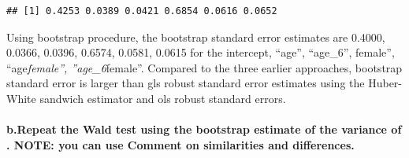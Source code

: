 \documentclass[
]{article}
\begin{document}
\begin{verbatim}
## [1] 0.4253 0.0389 0.0421 0.6854 0.0616 0.0652
\end{verbatim}

Using bootstrap procedure, the bootstrap standard error estimates are
0.4000, 0.0366, 0.0396, 0.6574, 0.0581, 0.0615 for the intercept,
``age'', ``age\_6'', female'', ``age\emph{female'', ''age\_6}female''.
Compared to the three earlier approaches, bootstrap standard error is
larger than gls robust standard error estimates using the Huber-White
sandwich estimator and ols robust standard errors.

\hypertarget{b.repeat-the-wald-test-using-the-bootstrap-estimate-of-the-variance-of-.-note-you-can-use-comment-on-similarities-and-differences.}{%
\paragraph{b.Repeat the Wald test using the bootstrap estimate of the
variance of . NOTE: you can use Comment on similarities and
differences.}\label{b.repeat-the-wald-test-using-the-bootstrap-estimate-of-the-variance-of-.-note-you-can-use-comment-on-similarities-and-differences.}}
\end{document}
